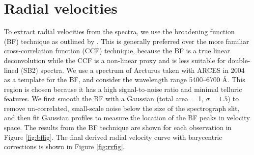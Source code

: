 \section{Radial velocities}\label{rvs}
To extract radial velocities from the spectra, we use the broadening function (BF) technique as outlined by \citet{ruc02}. This is generally preferred over the more familiar cross-correlation function (CCF) technique, because the BF is a true linear deconvolution while the CCF is a non-linear proxy and is less suitable for double-lined (SB2) spectra. We use a spectrum of Arcturus taken with ARCES in 2004 as a template for the BF, and consider the wavelength range 5400--6700 \AA. This region is chosen because it has a high signal-to-noise ratio and minimal telluric features. We first smooth the BF with a Gaussian (total area = 1, $\sigma=1.5$) to remove un-correlated, small-scale noise below the size of the spectrograph slit, and then fit Gaussian profiles to measure the location of the BF peaks in velocity space. The results from the BF technique are shown for each observation in Figure \ref{fig:bffig}. The final derived radial velocity curve with barycentric corrections is shown in Figure \ref{fig:rvfig}.

